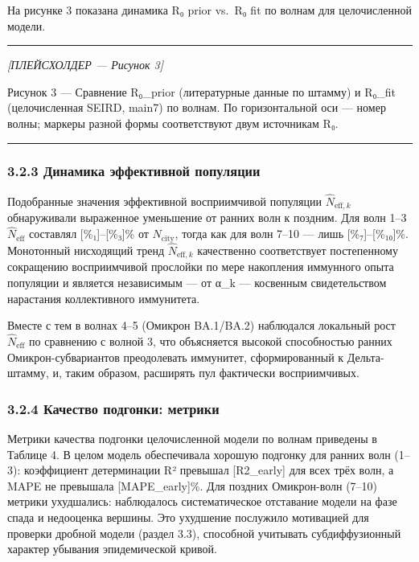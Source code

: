 \documentclass[12pt]{article}
\begin{document}
На рисунке 3 показана динамика R₀ prior vs.~R₀ fit по волнам для
целочисленной модели.

\begin{center}\rule{0.5\linewidth}{0.5pt}\end{center}

\emph{{[}ПЛЕЙСХОЛДЕР --- Рисунок 3{]}}

Рисунок 3 --- Сравнение R₀\_prior (литературные данные по штамму) и
R₀\_fit (целочисленная SEIRD, main7) по волнам. По горизонтальной оси
--- номер волны; маркеры разной формы соответствуют двум источникам R₀.

\begin{center}\rule{0.5\linewidth}{0.5pt}\end{center}

\subsubsection{3.2.3 Динамика эффективной
популяции}\label{ux434ux438ux43dux430ux43cux438ux43aux430-ux44dux444ux444ux435ux43aux442ux438ux432ux43dux43eux439-ux43fux43eux43fux443ux43bux44fux446ux438ux438}

Подобранные значения эффективной восприимчивой популяции
\(\hat{N}_{\text{eff},k}\) обнаруживали выраженное уменьшение от ранних
волн к поздним. Для волн 1--3 \(\hat{N}_{\text{eff}}\) составлял
{[}\%₁{]}--{[}\%₃{]}\% от \(N_{\text{city}}\), тогда как для волн 7--10
--- лишь {[}\%₇{]}--{[}\%₁₀{]}\%. Монотонный нисходящий тренд
\(\hat{N}_{\text{eff},k}\) качественно соответствует постепенному
сокращению восприимчивой прослойки по мере накопления иммунного опыта
популяции и является независимым --- от α\_k --- косвенным
свидетельством нарастания коллективного иммунитета.

Вместе с тем в волнах 4--5 (Омикрон BA.1/BA.2) наблюдался локальный рост
\(\hat{N}_{\text{eff}}\) по сравнению с волной 3, что объясняется
высокой способностью ранних Омикрон-субвариантов преодолевать иммунитет,
сформированный к Дельта-штамму, и, таким образом, расширять пул
фактически восприимчивых.

\subsubsection{3.2.4 Качество подгонки:
метрики}\label{ux43aux430ux447ux435ux441ux442ux432ux43e-ux43fux43eux434ux433ux43eux43dux43aux438-ux43cux435ux442ux440ux438ux43aux438}

Метрики качества подгонки целочисленной модели по волнам приведены в
Таблице 4. В целом модель обеспечивала хорошую подгонку для ранних волн
(1--3): коэффициент детерминации R² превышал {[}R2\_early{]} для всех
трёх волн, а MAPE не превышала {[}MAPE\_early{]}\%. Для поздних
Омикрон-волн (7--10) метрики ухудшались: наблюдалось систематическое
отставание модели на фазе спада и недооценка вершины. Это ухудшение
послужило мотивацией для проверки дробной модели (раздел 3.3), способной
учитывать субдиффузионный характер убывания эпидемической кривой.
\end{document}
